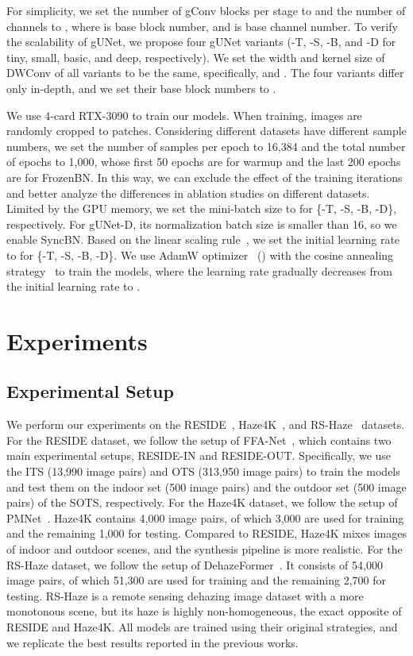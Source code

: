 \documentclass[10pt,twocolumn,letterpaper]{article}
\begin{document}
For simplicity, we set the number of gConv blocks per stage to  and the number of channels to , where  is base block number, and  is base channel number.
To verify the scalability of gUNet, we propose four gUNet variants (-T, -S, -B, and -D for tiny, small, basic, and deep, respectively).
We set the width and kernel size  of DWConv of all variants to be the same, specifically,  and .
The four variants differ only in-depth, and we set their base block numbers  to .

We use 4-card RTX-3090 to train our models.
When training, images are randomly cropped to  patches.
Considering different datasets have different sample numbers, we set the number of samples per epoch to 16,384 and the total number of epochs to 1,000, whose first 50 epochs are for warmup and the last 200 epochs are for FrozenBN.
In this way, we can exclude the effect of the training iterations and better analyze the differences in ablation studies on different datasets.
Limited by the GPU memory, we set the mini-batch size to  for \{-T, -S, -B, -D\}, respectively.
For gUNet-D, its normalization batch size is smaller than 16, so we enable SyncBN.
Based on the linear scaling rule~\cite{goyal2017accurate}, we set the initial learning rate to  for \{-T, -S, -B, -D\}.
We use AdamW optimizer~\cite{loshchilov2017decoupled} () with the cosine annealing strategy~\cite{loshchilov2016sgdr} to train the models, where the learning rate gradually decreases from the initial learning rate to .
 \section{Experiments}

\subsection{Experimental Setup}

We perform our experiments on the RESIDE~\cite{li2018benchmarking}, Haze4K~\cite{liu2021synthetic}, and RS-Haze~\cite{song2022vision} datasets.
For the RESIDE dataset, we follow the setup of FFA-Net~\cite{qin2020ffa}, which contains two main experimental setups, RESIDE-IN and RESIDE-OUT.
Specifically, we use the ITS (13,990 image pairs) and OTS (313,950 image pairs) to train the models and test them on the indoor set (500 image pairs) and the outdoor set (500 image pairs) of the SOTS, respectively.
For the Haze4K dataset, we follow the setup of PMNet~\cite{ye2021perceiving}.
Haze4K contains 4,000 image pairs, of which 3,000 are used for training and the remaining 1,000 for testing. 
Compared to RESIDE, Haze4K mixes images of indoor and outdoor scenes, and the synthesis pipeline is more realistic.
For the RS-Haze dataset, we follow the setup of DehazeFormer~\cite{song2022vision}.
It consists of 54,000 image pairs, of which 51,300 are used for training and the remaining 2,700 for testing. 
RS-Haze is a remote sensing dehazing image dataset with a more monotonous scene, but its haze is highly non-homogeneous, the exact opposite of RESIDE and Haze4K.
All models are trained using their original strategies, and we replicate the best results reported in the previous works.
\end{document}
